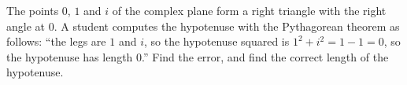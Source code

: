 The points $0$, $1$ and $i$ of the complex plane form a right triangle with the right angle at $0$. A student computes the hypotenuse with the Pythagorean theorem as follows: ``the legs are $1$ and $i$, so the hypotenuse squared is $1^2+i^2=1-1=0$, so the hypotenuse has length $0$.'' Find the error, and find the correct length of the hypotenuse.
